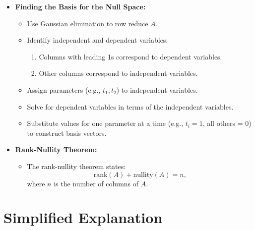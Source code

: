 \documentclass{article}
\begin{document}
\begin{itemize}
  \item \textbf{Finding the Basis for the Null Space:}
    \begin{itemize}
      \item Use Gaussian elimination to row reduce $A$.
      \item Identify independent and dependent variables:
        \begin{enumerate}
          \item Columns with leading 1s correspond to dependent variables.
          \item Other columns correspond to independent variables.
        \end{enumerate}
      \item Assign parameters (e.g., $t_1, t_2$) to independent variables.
      \item Solve for dependent variables in terms of the independent variables.
      \item Substitute values for one parameter at a time (e.g., $t_i = 1$, all others = 0) to construct basis vectors.
    \end{itemize}

  \item \textbf{Rank-Nullity Theorem:}
    \begin{itemize}
      \item The rank-nullity theorem states:
        \[
          \text{rank}(A) + \text{nullity}(A) = n,
        \]
        where $n$ is the number of columns of $A$.
    \end{itemize}
\end{itemize}

\section*{Simplified Explanation}
\end{document}

